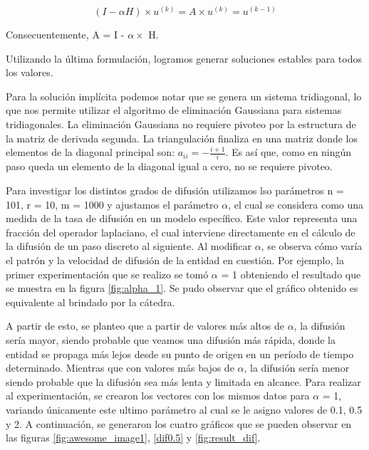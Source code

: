 \begin{equation}
(I - \alpha H) \times u^{(k)} = A \times u^{(k)} =  u^{(k-1)}
\end{equation}

Consecuentemente, A = I - $\alpha \times$ H.


Utilizando la última formulación, logramos generar soluciones estables para todos los valores.

Para la solución implícita podemos notar que se genera un sistema tridiagonal, lo que nos permite utilizar el algoritmo de eliminación Gaussiana para sistemas tridiagonales. La eliminación Gaussiana no requiere pivoteo por la estructura de la matriz de derivada segunda. La triangulación finaliza en una matriz donde los elementos de la diagonal principal son: $a_{ii} = - \frac{i+1}{i}$. 
Es así que, como en ningún paso queda un elemento de la diagonal igual a cero, no se requiere pivoteo.\par

Para investigar los distintos grados de difusión utilizamos lso parámetros n = 101, r = 10, m = 1000 y ajustamos el parámetro $\alpha$, el cual se considera como una medida de la tasa de difusión en un modelo específico. Este valor representa una fracción del operador laplaciano, el cual interviene directamente en el cálculo de la difusión de un paso discreto al siguiente.
Al modificar $\alpha$, se observa cómo varía el patrón y la velocidad de difusión de la entidad en cuestión. Por ejemplo, la primer experimentación que se realizo se tomó $\alpha$ = 1 obteniendo el resultado que se muestra en la figura \ref{fig:alpha_1}. Se pudo observar que el gráfico obtenido es equivalente al brindado por la cátedra.

A partir de esto, se planteo que a partir de valores más altos de $\alpha$, la difusión sería mayor, siendo probable que veamos una difusión más rápida, donde la entidad se propaga más lejos desde su punto de origen en un período de tiempo determinado.
Mientras que con valores más bajos de $\alpha$, la difusión sería menor siendo probable que la difusión sea más lenta y limitada en alcance.
Para realizar al experimentación, se crearon los vectores con los mismos datos para $\alpha$ = 1, variando únicamente este ultimo parámetro al cual se le asigno valores de 0.1, 0.5 y 2.
A continuación, se generaron los cuatro gráficos que se pueden observar en las figuras \ref{fig:awesome_image1}, \ref{dif0.5} y \ref{fig:result_dif}.

